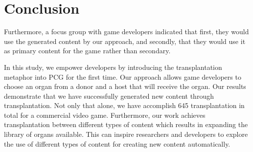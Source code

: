 \section{Conclusion}
\label{sec:Conclusion}




Furthermore, a focus group with game developers indicated that first, they would use the generated content by our approach, and secondly, that they would use it as primary content for the game rather than secondary.

In this study, we empower developers by introducing the transplantation metaphor into PCG for the first time. Our approach allows game developers to choose an organ from a donor and a host that will receive the organ.
Our results demonstrate that we have successfully generated new content through transplantation. Not only that alone, we have accomplish 645 transplantation in total for a commercial video game. Furthermore, our work achieves transplantation between different types of content which results in expanding the library of organs available. This can inspire researchers and developers to explore the use of different types of content for creating new content automatically. 

